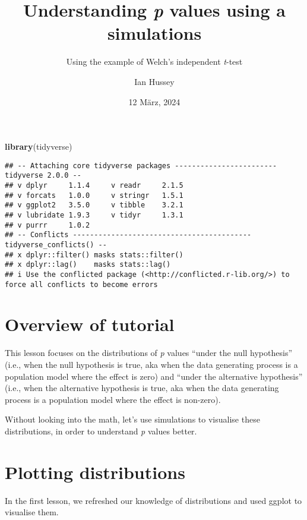 \documentclass[
]{article}
\title{Understanding \emph{p} values using a simulations}
\subtitle{Using the example of Welch's independent \emph{t}-test}
\author{Ian Hussey}
\date{12 März, 2024}
\newenvironment{Shaded}{\begin{snugshade}}{\end{snugshade}}
\newcommand{\FunctionTok}[1]{\textcolor[rgb]{0.13,0.29,0.53}{\textbf{#1}}}
\newcommand{\NormalTok}[1]{#1}
\begin{document}
\maketitle

{
\setcounter{tocdepth}{2}
\tableofcontents
}
\begin{Shaded}
\begin{Highlighting}[]
\FunctionTok{library}\NormalTok{(tidyverse)}
\end{Highlighting}
\end{Shaded}

\begin{verbatim}
## -- Attaching core tidyverse packages ------------------------ tidyverse 2.0.0 --
## v dplyr     1.1.4     v readr     2.1.5
## v forcats   1.0.0     v stringr   1.5.1
## v ggplot2   3.5.0     v tibble    3.2.1
## v lubridate 1.9.3     v tidyr     1.3.1
## v purrr     1.0.2     
## -- Conflicts ------------------------------------------ tidyverse_conflicts() --
## x dplyr::filter() masks stats::filter()
## x dplyr::lag()    masks stats::lag()
## i Use the conflicted package (<http://conflicted.r-lib.org/>) to force all conflicts to become errors
\end{verbatim}

\hypertarget{overview-of-tutorial}{%
\section{Overview of tutorial}\label{overview-of-tutorial}}

This lesson focuses on the distributions of \emph{p} values ``under the
null hypothesis'' (i.e., when the null hypothesis is true, aka when the
data generating process is a population model where the effect is zero)
and ``under the alternative hypothesis'' (i.e., when the alternative
hypothesis is true, aka when the data generating process is a population
model where the effect is non-zero).

Without looking into the math, let's use simulations to visualise these
distributions, in order to understand \emph{p} values better.

\hypertarget{plotting-distributions}{%
\section{Plotting distributions}\label{plotting-distributions}}

In the first lesson, we refreshed our knowledge of distributions and
used ggplot to visualise them.
\end{document}
